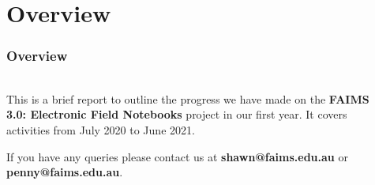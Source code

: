 \documentclass[
	aspectratio=169, %
	11pt, %
	t, %
]{beamer}
\begin{document}
\section{Overview}
\begin{sectionframe} %
	\frametitle{Overview}
	\framesubtitle{}

    \begin{columns}[t]
    \begin{column}{0.8\textwidth}
    {\color{faimsblue}\OpenSans\small
	This is a brief report to outline the progress we have made on the \textbf{FAIMS 3.0: Electronic Field Notebooks} project in our first year. It covers activities from July 2020 to June 2021.
	
	\medskip
	
    If you have any queries please contact us at \textbf{shawn@faims.edu.au} or \textbf{penny@faims.edu.au}.
    }
    \end{column}
    \begin{column}{0.15\textwidth}
    \end{column}
    \end{columns}

\end{sectionframe}




	
	
\end{document}
